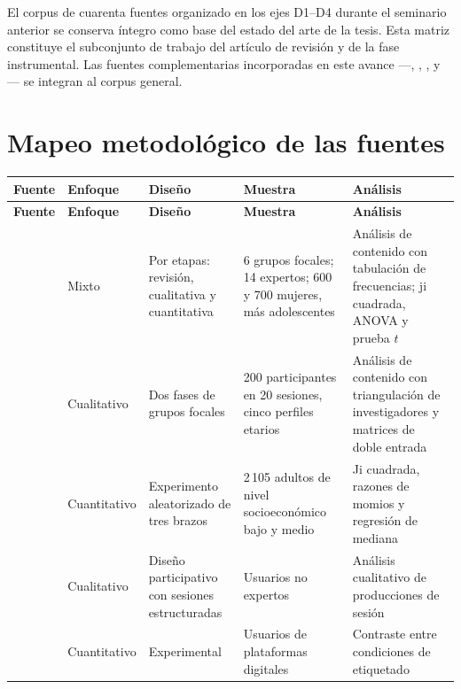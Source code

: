 \documentclass[letter,12pt]{article}
\begin{document}
El corpus de cuarenta fuentes organizado en los ejes D1--D4 durante el seminario anterior se conserva íntegro como base del estado del arte de la tesis. Esta matriz constituye el subconjunto de trabajo del artículo de revisión y de la fase instrumental. Las fuentes complementarias incorporadas en este avance ---\citet{jauregui2020intenciones}, \citet{tolentinomayo2025sefam}, \citet{egnell2018objetiva}, \citet{ares2020cocreacion} y \citet{nom051mod2020}--- se integran al corpus general.

\section{Mapeo metodológico de las fuentes}\label{sec:mapeo-metodologico}

\begin{longtable}{|p{2.3cm}|p{1.7cm}|p{2.6cm}|p{3.0cm}|p{2.6cm}|}
\hline
\rowcolor{bgCotejo}
\textbf{Fuente} & \textbf{Enfoque} & \textbf{Diseño} & \textbf{Muestra} & \textbf{Análisis} \\
\hline
\endfirsthead
\hline
\rowcolor{bgCotejo}
\textbf{Fuente} & \textbf{Enfoque} & \textbf{Diseño} & \textbf{Muestra} & \textbf{Análisis} \\
\hline
\endhead

\citet{reyes2019desarrollo} & Mixto & Por etapas: revisión, cualitativa y cuantitativa & 6 grupos focales; 14 expertos; 600 y 700 mujeres, más adolescentes & Análisis de contenido con tabulación de frecuencias; ji cuadrada, ANOVA y prueba $t$ \\
\hline

\citet{vargasmeza2019comprension} & Cualitativo & Dos fases de grupos focales & 200 participantes en 20 sesiones, cinco perfiles etarios & Análisis de contenido con triangulación de investigadores y matrices de doble entrada \\
\hline

\citet{vargasmeza2019aceptabilidad} & Cuantitativo & Experimento aleatorizado de tres brazos & 2\,105 adultos de nivel socioeconómico bajo y medio & Ji cuadrada, razones de momios y regresión de mediana \\
\hline

\citet{axelsson2021} & Cualitativo & Diseño participativo con sesiones estructuradas & Usuarios no expertos & Análisis cualitativo de producciones de sesión \\
\hline

\citet{seeger2026} & Cuantitativo & Experimental & Usuarios de plataformas digitales & Contraste entre condiciones de etiquetado \\
\hline

\end{longtable}
\end{document}
